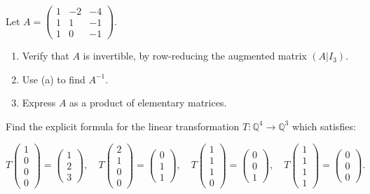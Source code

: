 \documentclass{eh-homework}
\begin{document}
    \begin{question}{2}
        Let \( A = \begin{pmatrix} 1 & -2 & -4 \\ 1 & 1 & -1 \\ 1 & 0 & -1 \end{pmatrix} \).

        \begin{enumerate}
            \item Verify that \( A \) is invertible, by row-reducing the augmented matrix \( (A | I_3) \).
            \item Use (a) to find \( A^{-1} \).
            \item Express \( A \) as a product of elementary matrices.
        \end{enumerate}
    \end{question}

    \begin{question}{3}
        Find the explicit formula for the linear transformation \( T : \mathbb{Q}^4 \to \mathbb{Q}^3 \) which satisfies:

        \[
        T\begin{pmatrix} 1 \\ 0 \\ 0 \\ 0 \end{pmatrix} = \begin{pmatrix} 1 \\ 2 \\ 3 \end{pmatrix}, \quad
        T\begin{pmatrix} 2 \\ 1 \\ 0 \\ 0 \end{pmatrix} = \begin{pmatrix} 0 \\ 1 \\ 1 \end{pmatrix}, \quad
        T\begin{pmatrix} 1 \\ 1 \\ 1 \\ 0 \end{pmatrix} = \begin{pmatrix} 0 \\ 0 \\ 1 \end{pmatrix}, \quad
        T\begin{pmatrix} 1 \\ 1 \\ 1 \\ 1 \end{pmatrix} = \begin{pmatrix} 0 \\ 0 \\ 0 \end{pmatrix}.
        \]
    \end{question}
\end{document}
